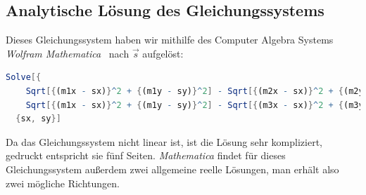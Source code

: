 \subsection{Analytische Lösung des Gleichungssystems}
Dieses Gleichungssystem haben wir mithilfe des Computer Algebra Systems \textit{Wolfram Mathematica}~\cite{mathematica} nach $\vec{s}$ aufgelöst:
\begin{lstlisting}[language=Mathematica,caption={Befehl für das Lösen des Gleichungssystem in \textit{Mathematica}.}]
  Solve[{
    Sqrt[{(m1x - sx)}^2 + {(m1y - sy)}^2] - Sqrt[{(m2x - sx)}^2 + {(m2y - sy)}^2] = dx12,
    Sqrt[{(m1x - sx)}^2 + {(m1y - sy)}^2] - Sqrt[{(m3x - sx)}^2 + {(m3y - sy)}^2] = dx13,}
  {sx, sy}]
\end{lstlisting}
Da das Gleichungssystem nicht linear ist, ist die Lösung sehr kompliziert, gedruckt entspricht sie fünf Seiten. \textit{Mathematica} findet für dieses Gleichungssystem außerdem zwei allgemeine reelle Lösungen, man erhält also zwei mögliche Richtungen.
